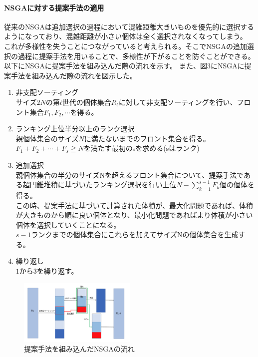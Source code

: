 \documentclass[10pt, a4paper, titlepage]{jarticle}
\begin{document}
\paragraph{NSGAに対する提案手法の適用}
従来のNSGAは追加選択の過程において混雑距離大きいものを優先的に選択するようになっており、混雑距離が小さい個体は全く選択されなくなってしまう。
これが多様性を失うことにつながっていると考えられる。そこでNSGAの追加選択の過程に提案手法を用いることで、多様性が下がることを防ぐことができる。
以下にNSGAに提案手法を組み込んだ際の流れを示す。
また、図3にNSGAに提案手法を組み込んだ際の流れを図示した。
\begin{enumerate}
\item 非支配ソーティング\\
サイズ$2N$の第$ t $世代の個体集合$R_t$に対して非支配ソーティングを行い、フロント集合$F_1,F_2,\cdots $を得る。
\item ランキング上位半分以上のランク選択\\
親個体集合のサイズ$ N $に満たないまでのフロント集合を得る。
$F_1+F_2+\cdots+ F_s \geqq{N} $を満たす最初のsを求める(sはランク)
\item 追加選択\\
親個体集合の半分のサイズNを超えるフロント集合について、提案手法である超円錐堆積に基づいたランキング選択を行い上位$ N - \sum_{k=1}^{s-1}F_k $個の個体を得る。\\
この時、提案手法に基づいて計算された体積が、最大化問題であれば、体積が大きものから順に良い個体となり、最小化問題であればより体積が小さい個体を選択していくことになる。
\\ $s-1$ランクまでの個体集合にこれらを加えてサイズNの個体集合を生成する。
\item 繰り返し\\ 
$1$から$3$を繰り返す。
\end{enumerate}

\begin{figure}[h]
\begin{center}
\includegraphics[width=0.5\textwidth]{NSGA2.png}
\end{center}
\label{NSGA}
\caption{
提案手法を組み込んだNSGAの流れ
}
\end{figure}
\end{document}

